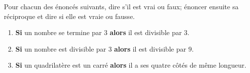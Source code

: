 
\begin{exercice}\label{exosmath-0812}

Pour chacun des énoncés suivants, dire s'il est vrai ou faux; énoncer ensuite sa réciproque et dire si elle est vraie ou fausse.
\begin{enumerate}
    \item
        {\bf Si} un nombre se termine par $3$ {\bf alors} il est divisible par $3$.
\item
    {\bf Si} un nombre est divisible par $3$ {\bf alors} il est divisible par $9$.
\item
    {\bf Si} un quadrilatère est un carré {\bf alors} il a ses quatre côtés de même longueur.
\end{enumerate}


\end{exercice}
